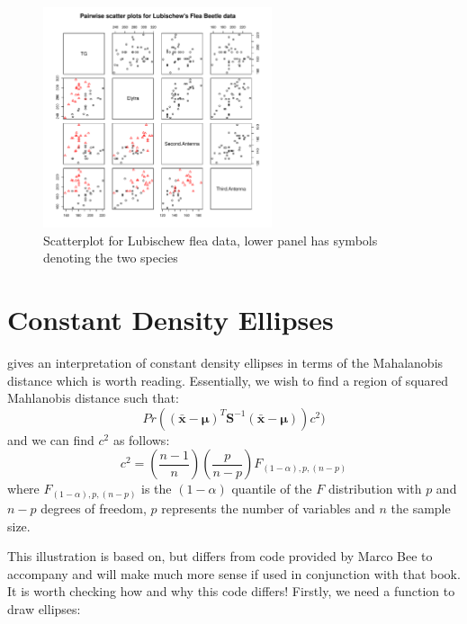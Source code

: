 \begin{figure}
\begin{center}
\includegraphics[width = 0.6\textwidth]{images/lubishew}
\caption{Scatterplot for Lubischew flea data, lower panel has symbols denoting the two species}
\label{lubishew}
\end{center}
\end{figure}



\section{Constant Density Ellipses}
\label{cdellipse}

\cite{Flury:1997} gives an interpretation of constant density ellipses in terms of the Mahalanobis distance which is worth reading.   Essentially, we wish to find a region of squared Mahlanobis distance such that:
\begin{displaymath}
Pr \left( (\boldsymbol{\bar{x}} - \boldsymbol{\mu})^{T} \boldsymbol{S}^{-1} (\boldsymbol{\bar{x}} - \boldsymbol{\mu}) \right) c^{2}) 
\end{displaymath}
and we can find $c^{2}$ as follows:
\begin{displaymath}
c^{2} = \left( \frac{n-1}{n} \right) \left( \frac{p}{n-p} \right) F_{(1-\alpha), p, (n-p)}
\end{displaymath}
where $F_{(1-\alpha), p, (n-p)}$ is the $(1-\alpha)$ quantile of the $F$ distribution with $p$ and $n-p$ degrees of freedom, $p$ represents the number of variables and $n$ the sample size.


This illustration is based on, but differs from code provided by Marco Bee to accompany and will make much more sense if used in conjunction with that book.   It is worth checking how and why this code differs!   Firstly, we need a function to draw ellipses:

